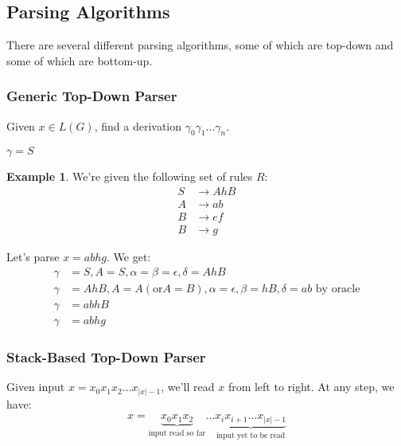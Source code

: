 \documentclass[]{article}
\theoremstyle{definition}
\newtheorem{ex}{Example}[section]
\begin{document}
		\subsection{Parsing Algorithms}
			There are several different parsing algorithms, some of which are top-down and some of which are bottom-up.
			\subsubsection{Generic Top-Down Parser}
				Given $x \in L(G)$, find a derivation $\gamma_0 \gamma_1 \ldots \gamma_n$.

				\begin{algorithm}[H]
					$\gamma = S$\;
				\end{algorithm}

				\begin{ex}
					We're given the following set of rules $R$:
					\begin{align*}
						S &\to AhB \\
						A &\to ab \\
						B &\to ef \\
						B &\to g
					\end{align*}

					Let's parse $x = abhg$. We get:
					\begin{align*}
						\gamma &= S, A = S, \alpha = \beta = \epsilon, \delta = AhB \\
						\gamma &= AhB, A = A (\text{or} A = B), \alpha = \epsilon, \beta = hB, \delta = ab \text{ by oracle} \\
						\gamma &= abhB \\
						\gamma &= abhg
					\end{align*}
				\end{ex}

			\subsubsection{Stack-Based Top-Down Parser}
				Given input $x = x_0 x_1 x_2 \ldots x_{|x|-1}$, we'll read $x$ from left to right. At any step, we have:
				\begin{align*}
					x = \underbrace{x_0 x_1 x_2}_{\text{input read so far}} \ldots \underbrace{x_i x_{i + 1} \ldots x_{|x| - 1}}_{\text{input yet to be read}}
				\end{align*}
\end{document}
